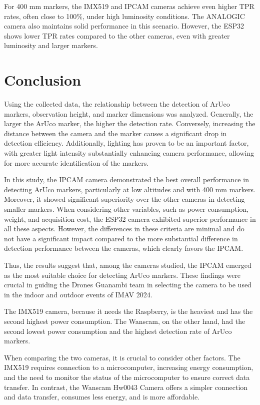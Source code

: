 \documentclass[letterpaper]{article}
\begin{document}
For 400 mm markers, the IMX519 and IPCAM cameras achieve even higher TPR rates, often close to 100\%, under high luminosity conditions. The ANALOGIC camera also maintains solid performance in this scenario. However, the ESP32 shows lower TPR rates compared to the other cameras, even with greater luminosity and larger markers.


\section{Conclusion}
Using the collected data, the relationship between the detection of ArUco markers, observation height, and marker dimensions was analyzed. Generally, the larger the ArUco marker, the higher the detection rate. Conversely, increasing the distance between the camera and the marker causes a significant drop in detection efficiency. Additionally, lighting has proven to be an important factor, with greater light intensity substantially enhancing camera performance, allowing for more accurate identification of the markers.

In this study, the IPCAM camera demonstrated the best overall performance in detecting ArUco markers, particularly at low altitudes and with 400 mm markers. Moreover, it showed significant superiority over the other cameras in detecting smaller markers. When considering other variables, such as power consumption, weight, and acquisition cost, the ESP32 camera exhibited superior performance in all these aspects. However, the differences in these criteria are minimal and do not have a significant impact compared to the more substantial difference in detection performance between the cameras, which clearly favors the IPCAM.

Thus, the results suggest that, among the cameras studied, the IPCAM emerged as the most suitable choice for detecting ArUco markers. These findings were crucial in guiding the Drones Guanambi team in selecting the camera to be used in the indoor and outdoor events of IMAV 2024.

The IMX519 camera, because it needs the Raspberry, is the heaviest and has the second highest power consumption. The Wanscam, on the other hand, had the second lowest power consumption and the highest detection rate of ArUco markers.

When comparing the two cameras, it is crucial to consider other factors. The IMX519 requires connection to a microcomputer, increasing energy consumption, and the need to monitor the status of the microcomputer to ensure correct data transfer. In contrast, the Wanscam Hw0043 Camera offers a simpler connection and data transfer, consumes less energy, and is more affordable.
\end{document}
